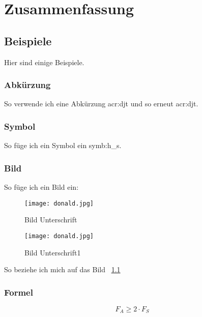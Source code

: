 
\chapter{Zusammenfassung}
\label{sec:conclusion_future-work}

\section{Beispiele}
\label{sec:Bsp}


Hier sind einige Beispiele.

\subsection{Abkürzung}
\label{subsec:abkürzung}

So verwende ich eine Abkürzung \gls{acr:djt} und so erneut \gls{acr:djt}.


\subsection{Symbol}
\label{subsec:symbol}
So füge ich ein Symbol ein \gls{symb:h_s}.


\subsection{Bild}
\label{subsec:Bild}
So füge ich ein Bild ein:

\begin{figure}[H]
	\centering
	\texttt{[image: donald.jpg]}
	\caption[Titel für das Abbildungsverzeichnis]{Bild Unterschrift \cite{wangVisibleLightCommunications2017}}
	\label{fig:donald}
\end{figure}


\begin{figure}[H]
	\centering
	\texttt{[image: donald.jpg]}
	\caption[Titel für das Abbildungsverzeichnis1]{Bild Unterschrift1 \cite{stinyAktiveElektronischeBauelemente2019}}
	\label{fig:donald1}
\end{figure}


So beziehe ich mich auf das Bild ~\ref{fig:donald}

\subsection{Formel}
\label{subsec:formel}

\begin{equation}
	\label{equ:bsp1}
	F_{A} \geq 2 \cdot F_{S}
\end{equation}


